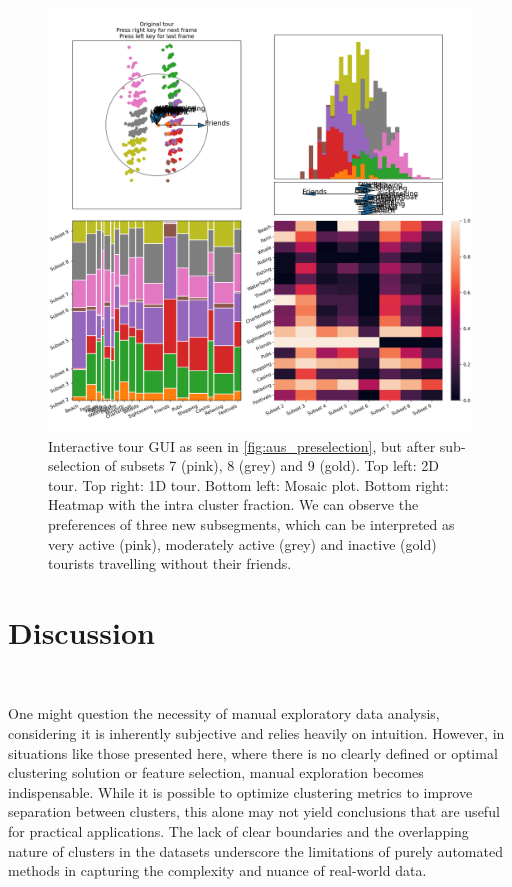 \documentclass[article]{ajs}
\begin{document}
\begin{figure}[h!]
    \centering
    \includegraphics[width=1\textwidth]{aus_selection.pdf}
    \caption{Interactive tour GUI as seen in \ref{fig:aus_preselection}, but after sub-selection of subsets 7 (pink), 8 (grey) and 9 (gold). Top left: 2D tour. Top right: 1D tour. Bottom left: Mosaic plot. Bottom right: Heatmap with the intra cluster fraction. We can observe the preferences of three new subsegments, which can be interpreted as very active (pink), moderately active (grey) and inactive (gold) tourists travelling without their friends.}
    \label{fig:aus_selection}
\end{figure}


\section{Discussion}~\label{discussion}

One might question the necessity of manual exploratory data analysis, considering it is inherently subjective and relies heavily on intuition. However, in situations like those presented here, where there is no clearly defined or optimal clustering solution or feature selection, manual exploration becomes indispensable. While it is possible to optimize clustering metrics to improve separation between clusters, this alone may not yield conclusions that are useful for practical applications. The lack of clear boundaries and the overlapping nature of clusters in the datasets underscore the limitations of purely automated methods in capturing the complexity and nuance of real-world data.
\end{document}
